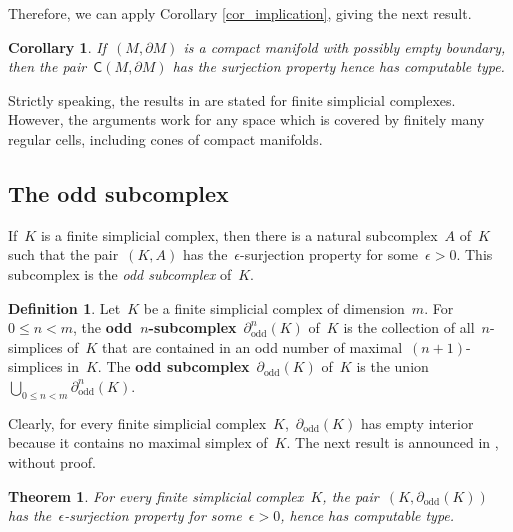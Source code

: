 \documentclass[english,11pt]{article}
\theoremstyle{plain}
\newtheorem{theorem}{Theorem}[section]
\newtheorem{corollary}{Corollary}[section]
\theoremstyle{remark}
\theoremstyle{definition}
\newtheorem{definition}{Definition}[section]
\newcommand{\odd}[1]{\partial_\mathrm{odd}(#1)}
\newcommand{\oddn}[2]{\partial^{#1}_\mathrm{odd}(#2)}
\newcommand{\C}[1]{\mathsf{C}(#1)}%
\begin{document}
Therefore, we can apply Corollary \ref{cor_implication}, giving the next result.
\begin{corollary}\label{cor_cone_manifold}
If~$(M,\partial M)$ is a compact manifold with possibly empty boundary, then the pair~$\C{M,\partial M}$ has the surjection property hence has computable type.
\end{corollary}

Strictly speaking, the results in \cite{AH22} are stated for finite simplicial complexes. However, the arguments work for any space which is covered by finitely many regular cells, including cones of compact manifolds.


\subsection{The odd subcomplex}
If~$K$ is a finite simplicial complex, then there is a natural subcomplex~$A$ of~$K$ such that the pair~$(K,A)$ has the~$\epsilon$-surjection property for some~$\epsilon>0$. This subcomplex is the \emph{odd subcomplex} of~$K$.

\begin{definition}
Let~$K$ be a finite simplicial complex of dimension~$m$. For~$0\leq n< m$,
the \textbf{odd~$n$-subcomplex}~$\oddn nK$ of~$K$ is the collection
of all~$n$-simplices of~$K$ that are contained in an odd number
of maximal~$(n+1)$-simplices in~$K$. The \textbf{odd subcomplex}~$\odd K$
of~$K$ is the union~$\bigcup_{0\leq n< m}\oddn nK$.
\end{definition}

Clearly, for every finite simplicial complex~$K$,~$\odd K$ has empty interior because it contains no maximal simplex of~$K$. The next result is announced in \cite{AH22}, without proof.

\begin{theorem}
\label{thm_odd}For every finite simplicial complex~$K$, the pair~$(K,\odd K)$ has the~$\epsilon$-surjection property for some~$\epsilon>0$, hence has computable type.
\end{theorem}
\end{document}
